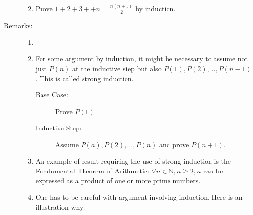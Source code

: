 \documentclass[10pt]{article}
\begin{document}
\begin{description}
\begin{enumerate}
			\item Prove $1+2+3+ +n= \frac{n(n+1)}{2}$ by induction.
		\end{enumerate}
		\item[Remarks:]
		\begin{enumerate}
			\item[]
			\item For some argument by induction, it might be necessary to assume not just $P(n)$ at the inductive step but also $P(1), P(2), \dots, P(n-1)$. This is called \underline{strong induction}.
			\begin{description}
				\item[Base Case:] Prove $P(1)$
				\item[Inductive Step:] Assume $P(a), P(2), \dots, P(n)$ and prove $P(n+1)$.
			\end{description}
			\item[] An example of result requiring the use of strong induction is the \underline{Fundamental Theorem of Arithmetic}: $\forall n \in \mathbb{N}, n \geq 2, n$ can be expressed as a product of one or more prime numbers.
			\item One has to be careful with argument involving induction. Here is an illustration why:

\end{enumerate}
\end{description}
\end{document}
